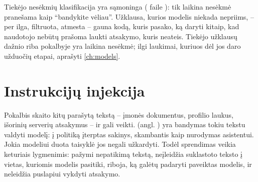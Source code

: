 Tiekėjo nesėkmių klasifikacija yra sąmoninga ( faile
): tik laikina nesėkmė pranešama kaip \enquote{bandykite vėliau}.
Užklausa, kurios modelis niekada nepriims, -- per ilga, filtruota, atmesta -- gauna kodą, kuris
pasako, ką daryti kitaip, kad naudotojo nebūtų prašoma laukti atsakymo, kuris neateis. Tiekėjo
užklausų dažnio riba pokalbyje yra laikina nesėkmė; ilgi laukimai, kuriuos dėl jos daro
užduočių etapai, aprašyti \cref{ch:models}.


\section{Instrukcijų injekcija}\label{sec:chat:injection}

Pokalbis skaito kitų parašytą tekstą -- įmonės dokumentus, profilio laukus, išorinių serverių
atsakymus -- ir gali veikti.  (angl. ) yra
bandymas tokiu tekstu valdyti modelį: į politiką įterptas sakinys, skambantis kaip nurodymas
asistentui. Jokia modeliui duota taisyklė jos negali užkardyti. Todėl sprendimas veikia keturiais
lygmenimis: pažymi nepatikimą tekstą, neįleidžia suklastoto teksto į vietas, kuriomis modelis
pasitiki, riboja, ką galėtų padaryti paveiktas modelis, ir neleidžia puslapiui vykdyti
atsakymo.

